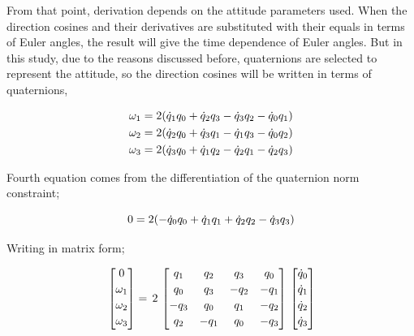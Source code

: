 From that point, derivation depends on the attitude parameters used. 
When the direction cosines and their derivatives are substituted with their equals in terms of Euler angles, the result will give the time dependence of Euler angles. 
But in this study, due to the reasons discussed before, quaternions are selected to represent the attitude, so the direction cosines will be written in terms of quaternions,

\begin{align}{\label{eqn:angVelocityQuaternion}}
\begin{split}
\omega_1 & = 2 (\dot{q}_1 q_0 + \dot{q}_2 q_3 - \dot{q}_3 q_2 - \dot{q}_0 q_1) \\
\omega_2 & = 2 (\dot{q}_2 q_0 + \dot{q}_3 q_1 - \dot{q}_1 q_3 - \dot{q}_0 q_2) \\
\omega_3 & = 2 (\dot{q}_3 q_0 + \dot{q}_1 q_2 - \dot{q}_2 q_1 - \dot{q}_2 q_3)\\
\end{split}
\end{align}

Fourth equation comes from the differentiation of the quaternion norm constraint;

\begin{equation}{\label{eqn:kinematicEquDQM}}
0 = 2 (- \dot{q}_0 q_0 + \dot{q}_1 q_1 + \dot{q}_2 q_2 - \dot{q}_3 q_3)
\end{equation}

Writing in matrix form;

\begin{equation}{\label{eqn:kinematicEquAngVel}}
\begin{bmatrix}
0\\[0.2em]
\omega_1\\[0.2em]
\omega_2\\[0.2em]
\omega_3\\[0.2em]
\end{bmatrix}
 =\,
 2\,
\begin{bmatrix}
q_1 & q_2 & q_3 & q_0 \\[0.2em]
q_0 & q_3 & -q_2 & -q_1 \\[0.2em]
-q_3 & q_0 & q_1 & -q_2 \\[0.2em]
q_2 & -q_1 & q_0 & -q_3 \\[0.2em]
\end{bmatrix}
\,
\begin{bmatrix}
\dot{q}_0\\[0.2em]
\dot{q}_1\\[0.2em]
\dot{q}_2\\[0.2em]
\dot{q}_3\\[0.2em]
\end{bmatrix}
\end{equation}
 

